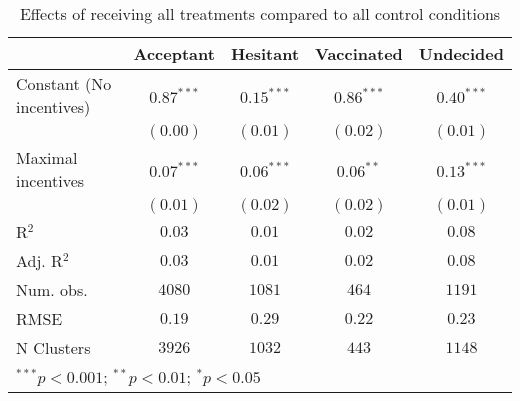 
\begin{table}[h!]
\begin{center}
\begin{tabular}{l c c c c}
\hline
 & Acceptant & Hesitant & Vaccinated & Undecided \\
\hline
Constant (No incentives) & $0.87^{***}$ & $0.15^{***}$ & $0.86^{***}$ & $0.40^{***}$ \\
                         & $(0.00)$     & $(0.01)$     & $(0.02)$     & $(0.01)$     \\
Maximal incentives       & $0.07^{***}$ & $0.06^{***}$ & $0.06^{**}$  & $0.13^{***}$ \\
                         & $(0.01)$     & $(0.02)$     & $(0.02)$     & $(0.01)$     \\
\hline
R$^2$                    & $0.03$       & $0.01$       & $0.02$       & $0.08$       \\
Adj. R$^2$               & $0.03$       & $0.01$       & $0.02$       & $0.08$       \\
Num. obs.                & $4080$       & $1081$       & $464$        & $1191$       \\
RMSE                     & $0.19$       & $0.29$       & $0.22$       & $0.23$       \\
N Clusters               & $3926$       & $1032$       & $443$        & $1148$       \\
\hline
\multicolumn{5}{l}{\scriptsize{$^{***}p<0.001$; $^{**}p<0.01$; $^{*}p<0.05$}}
\end{tabular}
\caption{\label{omnibus} Effects of receiving all treatments compared to all control conditions}
\label{table:coefficients}
\end{center}
\end{table}

